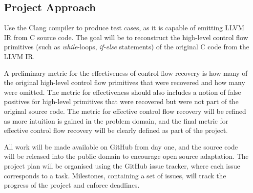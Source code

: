 
\subsection{Project Approach}


Use the Clang compiler to produce test cases, as it is capable of emitting LLVM IR from C source code. The goal will be to reconstruct the high-level control flow primitives (such as \textit{while}-loops, \textit{if-else} statements) of the original C code from the LLVM IR.


A preliminary metric for the effectiveness of control flow recovery is how many of the original high-level control flow primitives that were recovered and how many were omitted. The metric for effectiveness should also includes a notion of false positives for high-level primitives that were recovered but were not part of the original source code. The metric for effective control flow recovery will be refined as more intuition is gained in the problem domain, and the final metric for effective control flow recovery will be clearly defined as part of the project.


All work will be made available on GitHub from day one, and the source code will be released into the public domain to encourage open source adaptation. The project plan will be organised using the GitHub issue tracker, where each issue corresponds to a task. Milestones, containing a set of issues, will track the progress of the project and enforce deadlines.
